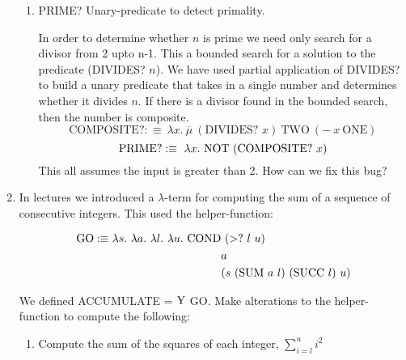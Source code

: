 \documentclass[11pt]{report}
\begin{document}
\begin{enumerate}
\begin{enumerate}
			\item PRIME? Unary-predicate to detect primality.
			
			In order to determine whether $n$ is prime we need only search for a divisor from 2 upto n-1. This a bounded search for a solution to the predicate (DIVIDES? $n$). We have used partial application of DIVIDES? to build a unary predicate that takes in a single number and determines whether it divides $n$. If there is a divisor found in the bounded search, then the number is composite. 
			$$\text{COMPOSITE?}:\equiv \ \lambda x. \ \overline{\mu} \ (\text{DIVIDES? } x) \ \text{TWO} \ (- \ x \ \text{ONE})$$			
			$$\text{PRIME?}:\equiv \ \lambda x. \ \NOT \ (\text{COMPOSITE? } x)$$
			This all assumes the input is greater than 2. How can we fix this bug?
		\end{enumerate}
	

	\newpage
	 \item In lectures we introduced a $\lambda$-term for computing the sum of a sequence of consecutive integers. This used the helper-function: 
	
	 \begin{align*}
	 	\GO :\equiv \lambda s. \ \lambda a. \ \lambda l. \ \lambda u. \ \COND & \ (>? \ l \ u) \\
	 	& a \\ 
	 	&(s \ (\SUM \ a \ l) \ (\SUCC \ l) \ u)
	 \end{align*}
	
	 We defined ACCUMULATE = $\text{Y}$ GO. Make alterations to the helper-function to compute the following: 
	
	 \begin{enumerate}
	 	\item Compute the sum of the squares of each integer, $\sum_{i=l}^u i^{2}$	 
	 		

\end{enumerate}
\end{enumerate}
\end{document}
